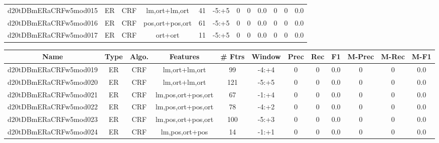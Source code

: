 \documentclass[a4paper]{article}
\begin{document}
\begin{landscape}
\begin{center}
\begin{tabular}{ |c|c|c|c|c|c|c|c|c|c|c|c|}
 
 	
 	\small{ d20tDBmERaCRFw5mod015 } & ER & CRF & lm,ort+lm,ort  &  41 &  -5:+5  &  0 & 0 & 0.0  &  0 & 0 & 0.0 \\
 	

 
 	
 	\small{ d20tDBmERaCRFw5mod016 } & ER & CRF & pos,ort+pos,ort  &  61 &  -5:+5  &  0 & 0 & 0.0  &  0 & 0 & 0.0 \\
 	

 
 	
 	\small{ d20tDBmERaCRFw5mod017 } & ER & CRF & ort+ort  &  11 &  -5:+5  &  0 & 0 & 0.0  &  0 & 0 & 0.0 \\
 	
 \hline
\end{tabular}
\end{center}




\begin{center}
\begin{tabular}{ |c|c|c|c|c|c|c|c|c|c|c|c|} 
 \hline
 	Name & Type & Algo. & Features & \# Ftrs & Window & Prec & Rec & F1 & M-Prec & M-Rec & M-F1\\
 \hline

 	

 
 	
 	\small{ d20tDBmERaCRFw5mod019 } & ER & CRF & lm,ort+lm,ort  &  99 &  -4:+4  &  0 & 0 & 0.0  &  0 & 0 & 0.0 \\
 	

 
 	
 	\small{ d20tDBmERaCRFw5mod020 } & ER & CRF & lm,ort+lm,ort  &  121 &  -5:+5  &  0 & 0 & 0.0  &  0 & 0 & 0.0 \\
 	

 
 	
 	\small{ d20tDBmERaCRFw5mod021 } & ER & CRF & lm,pos,ort+pos,ort  &  67 &  -1:+4  &  0 & 0 & 0.0  &  0 & 0 & 0.0 \\
 	

 
 	
 	\small{ d20tDBmERaCRFw5mod022 } & ER & CRF & lm,pos,ort+pos,ort  &  78 &  -4:+2  &  0 & 0 & 0.0  &  0 & 0 & 0.0 \\
 	

 
 	
 	\small{ d20tDBmERaCRFw5mod023 } & ER & CRF & lm,pos,ort+pos,ort  &  100 &  -5:+3  &  0 & 0 & 0.0  &  0 & 0 & 0.0 \\
 	

 
 	
 	\small{ d20tDBmERaCRFw5mod024 } & ER & CRF & lm,pos,ort+pos  &  14 &  -1:+1  &  0 & 0 & 0.0  &  0 & 0 & 0.0 \\
 	


\end{tabular}
\end{center}
\end{landscape}
\end{document}
